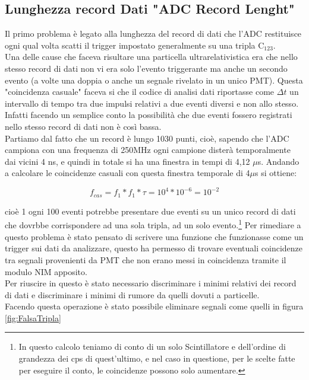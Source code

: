\documentclass[a4paper]{article}
\begin{document}
\subsection{Lunghezza record Dati "ADC Record Lenght"}
\label{secA:RecLenght}
Il primo problema è legato alla lunghezza del record di dati che l'ADC restituisce ogni qual volta scatti il trigger impostato generalmente su una tripla C$_{123}$.\\
Una delle cause che faceva risultare una particella ultrarelativistica era che nello stesso record di dati non vi era solo l'evento triggerante ma anche un secondo evento (a volte una doppia o anche un segnale rivelato in un unico PMT). Questa "coincidenza casuale" faceva si che il codice di analisi dati riportasse come $\Delta t$ un intervallo di tempo tra due impulsi relativi a due eventi diversi e non allo stesso.\\
Infatti facendo un semplice conto la possibilità che due eventi fossero registrati nello stesso record di dati non è così bassa.\\
Partiamo dal fatto che un record è lungo 1030 punti, cioè, sapendo che l'ADC campiona con una frequenza di 250MHz ogni campione disterà temporalmente dai vicini 4 ns, e quindi in totale si ha una finestra in tempi di 4,12 $\mu$s. Andando a calcolare le coincidenze casuali con questa finestra temporale di 4$\mu$s si ottiene:

\begin{equation}
f_{cas} = f_1*f_1*\tau = 10^4*10^{-6} = 10^{-2}
\end{equation}

cioè 1 ogni 100 eventi potrebbe presentare due eventi su un unico record di dati che dovrbbe corrispondere ad una sola tripla, ad un solo evento.\footnote{In questo calcolo teniamo di conto di un solo Scintillatore e dell'ordine di grandezza dei cps di quest'ultimo, e nel caso in questione, per le scelte fatte per eseguire il conto, le coincidenze possono solo aumentare.}
Per rimediare a questo problema è stato pensato di scrivere una funzione che funzionasse come un trigger sui dati da analizzare, questo ha permesso di trovare eventuali coincidenze tra segnali provenienti da PMT che non erano messi in coincidenza tramite il modulo NIM apposito.\\
Per riuscire in questo è stato necessario discriminare i minimi relativi dei record di dati e discriminare i minimi di rumore da quelli dovuti a particelle.\\
Facendo questa operazione è stato possibile eliminare segnali come quelli in figura \ref{fig:FalsaTripla}
\end{document}

